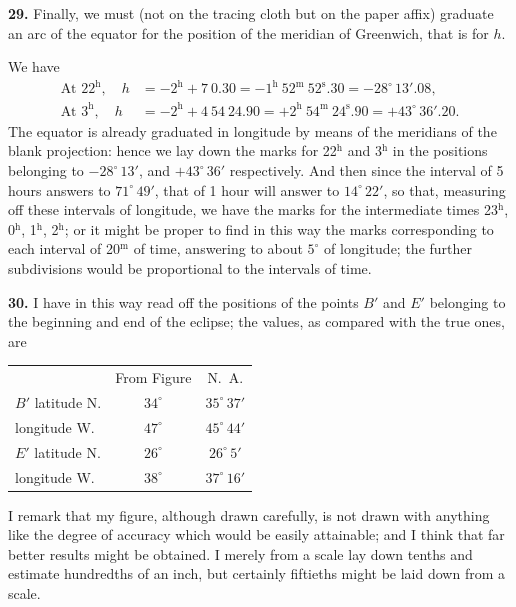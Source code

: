 \documentclass[11pt,a4paper]{article}
\begin{document}
\noindent\textbf{29.} Finally, we must (not on the tracing cloth but on the paper affix) graduate an arc of the equator for the position of the meridian of Greenwich, that is for $h$.

We have
\begin{align*}
\text{At } 22^{\text{h}},\quad h &= -2^{\text{h}} + 7\ 0.30 = -1^{\text{h}}\ 52^{\text{m}}\ 52^{\text{s}}.30 = -28^{\circ}\,13'.08,\\
\text{At } 3^{\text{h}},\quad h &= -2^{\text{h}} + 4\ 54\ 24.90 = +2^{\text{h}}\ 54^{\text{m}}\ 24^{\text{s}}.90 = +43^{\circ}\,36'.20.
\end{align*}
The equator is already graduated in longitude by means of the meridians of the blank projection: hence we lay down the marks for 22$^{\text{h}}$ and 3$^{\text{h}}$ in the positions belonging to $-28^{\circ}\,13'$, and $+43^{\circ}\,36'$ respectively. And then since the interval of 5 hours answers to $71^{\circ}\,49'$, that of 1 hour will answer to $14^{\circ}\,22'$, so that, measuring off these intervals of longitude, we have the marks for the intermediate times 23$^{\text{h}}$, 0$^{\text{h}}$, 1$^{\text{h}}$, 2$^{\text{h}}$; or it might be proper to find in this way the marks corresponding to each interval of 20$^{\text{m}}$ of time, answering to about $5^{\circ}$ of longitude; the further subdivisions would be proportional to the intervals of time.

\noindent\textbf{30.} I have in this way read off the positions of the points $B'$ and $E'$ belonging to the beginning and end of the eclipse; the values, as compared with the true ones, are

\begin{center}
\begin{tabular}{lcc}
 & From Figure & N.\ A. \\
$B'$ latitude N. & $34^{\circ}$ & $35^{\circ}\,37'$ \\
\quad longitude W. & $47^{\circ}$ & $45^{\circ}\,44'$ \\
$E'$ latitude N. & $26^{\circ}$ & $26^{\circ}\,5'$ \\
\quad longitude W. & $38^{\circ}$ & $37^{\circ}\,16'$ \\
\end{tabular}
\end{center}

I remark that my figure, although drawn carefully, is not drawn with anything like the degree of accuracy which would be easily attainable; and I think that far better results might be obtained. I merely from a scale lay down tenths and estimate hundredths of an inch, but certainly fiftieths might be laid down from a scale.
\end{document}
